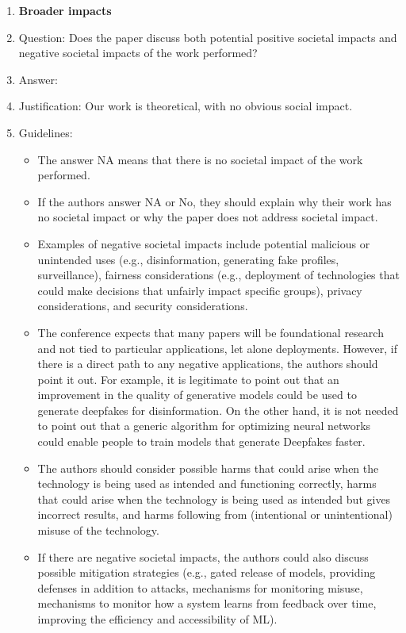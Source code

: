\documentclass{article}
\begin{document}
\begin{enumerate}
\item {\bf Broader impacts}
    \item[] Question: Does the paper discuss both potential positive societal impacts and negative societal impacts of the work performed?
    \item[] Answer: \answerNA{} %
    \item[] Justification: Our work is theoretical, with no obvious social impact.
    \item[] Guidelines:
    \begin{itemize}
        \item The answer NA means that there is no societal impact of the work performed.
        \item If the authors answer NA or No, they should explain why their work has no societal impact or why the paper does not address societal impact.
        \item Examples of negative societal impacts include potential malicious or unintended uses (e.g., disinformation, generating fake profiles, surveillance), fairness considerations (e.g., deployment of technologies that could make decisions that unfairly impact specific groups), privacy considerations, and security considerations.
        \item The conference expects that many papers will be foundational research and not tied to particular applications, let alone deployments. However, if there is a direct path to any negative applications, the authors should point it out. For example, it is legitimate to point out that an improvement in the quality of generative models could be used to generate deepfakes for disinformation. On the other hand, it is not needed to point out that a generic algorithm for optimizing neural networks could enable people to train models that generate Deepfakes faster.
        \item The authors should consider possible harms that could arise when the technology is being used as intended and functioning correctly, harms that could arise when the technology is being used as intended but gives incorrect results, and harms following from (intentional or unintentional) misuse of the technology.
        \item If there are negative societal impacts, the authors could also discuss possible mitigation strategies (e.g., gated release of models, providing defenses in addition to attacks, mechanisms for monitoring misuse, mechanisms to monitor how a system learns from feedback over time, improving the efficiency and accessibility of ML).
    \end{itemize}
    

\end{enumerate}
\end{document}
